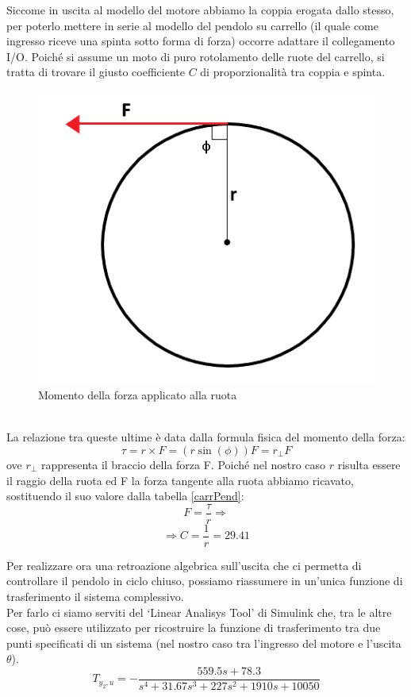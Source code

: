 Siccome in uscita al modello del motore abbiamo la coppia erogata dallo stesso, per poterlo mettere in serie al modello del pendolo su carrello (il quale come ingresso riceve una spinta sotto forma di forza) occorre adattare il collegamento I/O. Poiché si assume un moto di puro rotolamento delle ruote del carrello, si tratta di trovare il giusto coefficiente $C$ di proporzionalità tra coppia e spinta.
\begin{figure}[ht]
	\centering
	\includegraphics[scale=0.55]{braccioForza.PNG}
	\caption{Momento della forza applicato alla ruota}
	\label{braccioForza}
\end{figure}
\\La relazione tra queste ultime è data dalla formula fisica del momento della forza:
$$\tau=r\times F=(r\sin(\phi))F=r_{\bot}F$$
ove $r_{\bot}$ rappresenta il braccio della forza F.
Poiché nel nostro caso $r$ risulta essere il raggio della ruota ed F la forza tangente alla ruota abbiamo ricavato, sostituendo il suo valore dalla tabella \ref{carrPend}: $$F=\displaystyle\frac{\tau}{r}\Rightarrow$$$$\Rightarrow C=\displaystyle\frac{1}{r}=29.41$$

Per realizzare ora una retroazione algebrica sull'uscita che ci permetta di controllare il pendolo in ciclo chiuso, possiamo riassumere in un'unica funzione di trasferimento il sistema complessivo.\\
Per farlo ci siamo serviti del `Linear Analisys Tool' di Simulink che, tra le altre cose, può essere utilizzato per ricostruire la funzione di trasferimento tra due punti specificati di un sistema (nel nostro caso tra l'ingresso del motore e l'uscita $\theta$).
$$T_{y_2,u}=-\displaystyle\frac{559.5s+78.3}{s^4+31.67s^3+227s^2+1910s+10050}$$

